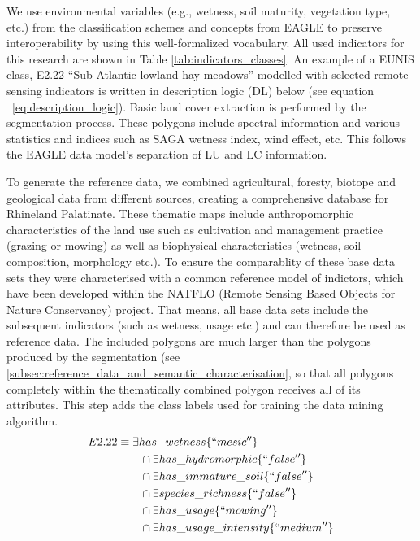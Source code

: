 \documentclass[authoryear,preprint,12pt,number]{elsarticle}
\begin{document}
\label{LC_biophysical}
We use environmental variables (e.g., wetness, soil maturity, vegetation type,
etc.) from the classification schemes and concepts from EAGLE to preserve
interoperability by using this well-formalized vocabulary. All used indicators
for this research are shown in Table \ref{tab:indicators_classes}. An example of
a EUNIS class, E2.22 ``Sub-Atlantic lowland hay meadows'' modelled with selected
remote sensing indicators is written in description logic (DL) below (see
equation ~\ref{eq:description_logic}). Basic land cover extraction is performed
by the segmentation process. 
These polygons include spectral information and various statistics and indices
such as SAGA wetness index, wind effect, etc. This follows the EAGLE data
model's separation of LU and LC information.

\label{LU_anthropomorphic}
To generate the reference data, we combined agricultural, foresty, biotope and
geological data from different sources, creating a comprehensive database for
Rhineland Palatinate. These thematic maps include anthropomorphic
characteristics of the land use such as cultivation and management practice 
(grazing or mowing)
as well as biophysical characteristics (wetness, soil composition, morphology
etc.). To ensure the comparablity of these base data sets they were
characterised with a common reference model of indictors, which have been
developed within the NATFLO (Remote Sensing Based Objects for Nature
Conservancy) project.  That means, all base data sets include the subsequent
indicators (such as wetness, usage etc.) and can therefore be used as reference
data. The included polygons are much larger than the polygons produced by the
segmentation (see \ref{subsec:reference_data_and_semantic_characterisation}, so 
that all polygons completely within the thematically combined polygon receives 
all of its attributes. This step adds the class labels used for training the 
data mining algorithm.
\begin{equation}
\begin{align*}
    E2.22 &\equiv \exists has\_wetness \{``mesic''\} \\
    &\qquad {} \cap \exists has\_hydromorphic \{``false''\} \\
    &\qquad {} \cap \exists has\_immature\_soil \{``false''\} \\
    &\qquad {} \cap \exists species\_richness \{``false''\} \\
    &\qquad {} \cap \exists has\_usage \{``mowing''\} \\
    &\qquad {} \cap \exists has\_usage\_intensity \{``medium''\} \\
\end{align*}
\label{eq:description_logic}
\end{equation}
\label{subsec:Selection_of_training_validation_data}
\end{document}
